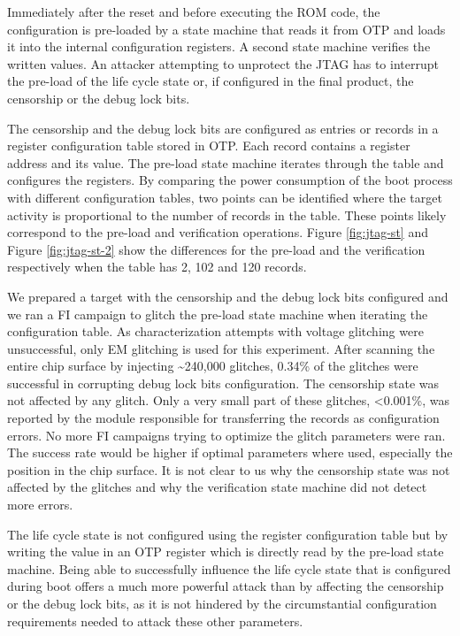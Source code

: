 \documentclass[a4paper, 10pt]{IEEEtran}
\begin{document}
Immediately after the reset and before executing the ROM code, the configuration is pre-loaded by a state machine that reads it from OTP and loads it into the internal configuration registers. A second state machine verifies the written values. An attacker attempting to unprotect the JTAG has to interrupt the pre-load of the life cycle state or, if configured in the final product, the censorship or the debug lock bits. 

The censorship and the debug lock bits are configured as entries or records in a register configuration table stored in OTP. Each record contains a register address and its value. The pre-load state machine iterates through the table and configures the registers. By comparing the power consumption of the boot process with different configuration tables, two points can be identified where the target activity is proportional to the number of records in the table. These points likely correspond to the pre-load and verification operations. Figure \ref{fig:jtag-st} and Figure \ref{fig:jtag-st-2} show the differences for the pre-load and the verification respectively when the table has 2, 102 and 120 records.

We prepared a target with the censorship and the debug lock bits configured and we ran a FI campaign to glitch the pre-load state machine when iterating the configuration table. As characterization attempts with voltage glitching were unsuccessful, only EM glitching is used for this experiment. After scanning the entire chip surface by injecting \textasciitilde240,000 glitches, 0.34\% of the glitches were successful in corrupting debug lock bits configuration. The censorship state was not affected by any glitch. Only a very small part of these glitches, <0.001\%, was reported by the module responsible for transferring the records as configuration errors. No more FI campaigns trying to optimize the glitch parameters were ran. The success rate would be higher if optimal parameters where used, especially the position in the chip surface. It is not clear to us why the censorship state was not affected by the glitches and why the verification state machine did not detect more errors.

The life cycle state is not configured using the register configuration table but by writing the value in an OTP register which is directly read by the pre-load state machine. Being able to successfully influence the life cycle state that is configured during boot offers a much more powerful attack than by affecting the censorship or the debug lock bits, as it is not hindered by the circumstantial configuration requirements needed to attack these other parameters.
\end{document}
